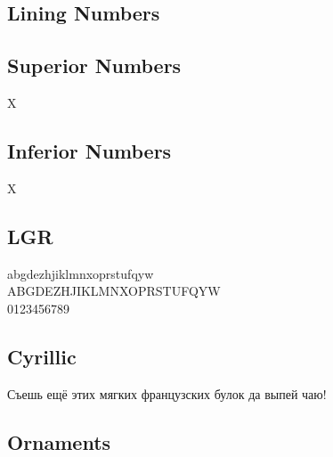 \documentclass[12pt]{article}
\begin{document}

\subsection*{Lining Numbers}


\subsection*{Superior Numbers}

X

\subsection*{Inferior Numbers}

X



\subsection*{LGR}

{\garamondlibrelgr\noindent
abgdezhjiklmnxoprstufqyw\\
ABGDEZHJIKLMNXOPRSTUFQYW\\
0123456789
}


\subsection*{Cyrillic}

{\ifxetex\else\ifluatex\else{}\selectfont\fi\fi 

Съешь ещё этих мягких французских булок да
выпей чаю!}

\subsection*{Ornaments}

\end{document}

